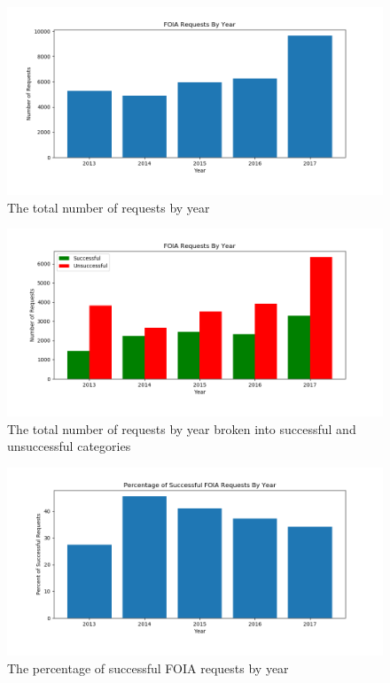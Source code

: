 \documentclass{article}
\begin{document}
		\begin{figure}[H]
			\centering
			\includegraphics[width=1\textwidth]{yearly_total}
			\caption{The total number of requests by year}
			\label{fig:yearly_total}
		\end{figure}
	
		\begin{figure}[H]
			\centering
			\includegraphics[width=1\textwidth]{yearly_breakdown}
			\caption{The total number of requests by year broken into successful and unsuccessful categories}
			\label{fig:yearly_breakdown}
		\end{figure}
	
		\begin{figure}[H]
			\centering
			\includegraphics[width=1\textwidth]{yearly_percent_successful}
			\caption{The percentage of successful FOIA requests by year}
			\label{fig:yearly_percent_successful}
		\end{figure}
	
\end{document}
